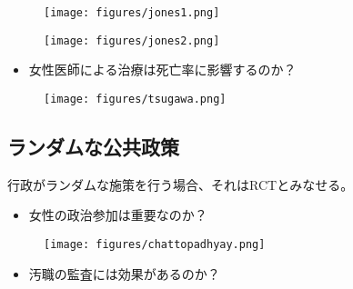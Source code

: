 \documentclass[
  xelatex,
  ja=standard]{bxjsarticle}
\providecommand{\tightlist}{%
  \setlength{\itemsep}{0pt}\setlength{\parskip}{0pt}}\usepackage{longtable,booktabs,array}
\begin{document}
\begin{figure}[htpb]

{\centering \texttt{[image: figures/jones1.png]}

}

\caption{\citet{jones2009}}

\end{figure}

\begin{figure}[htpb]

{\centering \texttt{[image: figures/jones2.png]}

}

\caption{\citet{jones2009}}

\end{figure}

\begin{itemize}
\tightlist
\item
  女性医師による治療は死亡率に影響するのか？\citep{tsugawa2017}
\end{itemize}

\begin{figure}[htpb]

{\centering \texttt{[image: figures/tsugawa.png]}

}

\caption{\citet{tsugawa2017}}

\end{figure}

\hypertarget{ux30e9ux30f3ux30c0ux30e0ux306aux516cux5171ux653fux7b56}{%
\subsection{ランダムな公共政策}\label{ux30e9ux30f3ux30c0ux30e0ux306aux516cux5171ux653fux7b56}}

行政がランダムな施策を行う場合、それはRCTとみなせる。

\begin{itemize}
\tightlist
\item
  女性の政治参加は重要なのか？
\end{itemize}

\begin{figure}[htpb]

{\centering \texttt{[image: figures/chattopadhyay.png]}

}

\caption{\citet{chattopadhyay2004}}

\end{figure}

\begin{itemize}
\tightlist
\item
  汚職の監査には効果があるのか？
\end{itemize}
\end{document}
